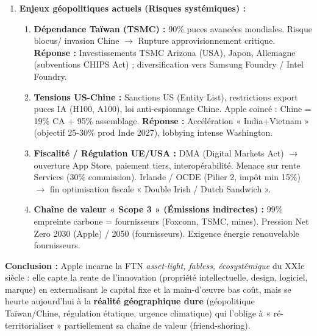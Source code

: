 \documentclass[11pt]{article}
\begin{document}
\begin{exoresolu}
\begin{enumerate}
        \item \textbf{Enjeux géopolitiques actuels (Risques systémiques) :}
            \begin{enumerate}
                \item \textbf{Dépendance Taïwan (TSMC) :} 90\% puces avancées mondiales. Risque blocus/ invasion Chine $\rightarrow$ Rupture approvisionnement critique. \textbf{Réponse :} Investissements TSMC Arizona (USA), Japon, Allemagne (subventions CHIPS Act) ; diversification vers Samsung Foundry / Intel Foundry.
                \item \textbf{Tensions US-Chine :} Sanctions US (Entity List), restrictions export puces IA (H100, A100), loi anti-espionnage Chine. Apple coincé : Chine = 19\% CA + 95\% assemblage. \textbf{Réponse :} Accélération « India+Vietnam » (objectif 25-30\% prod Inde 2027), lobbying intense Washington.
                \item \textbf{Fiscalité / Régulation UE/USA :} DMA (Digital Markets Act) $\rightarrow$ ouverture App Store, paiement tiers, interopérabilité. Menace sur rente Services (30\% commission). Irlande / OCDE (Pilier 2, impôt min 15\%) $\rightarrow$ fin optimisation fiscale « Double Irish / Dutch Sandwich ».
                \item \textbf{Chaîne de valeur « Scope 3 » (Émissions indirectes) :} 99\% empreinte carbone = fournisseurs (Foxconn, TSMC, mines). Pression Net Zero 2030 (Apple) / 2050 (fournisseurs). Exigence énergie renouvelable fournisseurs.
            \end{enumerate}
    \end{enumerate}
    \textbf{Conclusion :} Apple incarne la FTN \emph{asset-light, fabless, écosystémique} du XXIe siècle : elle capte la rente de l'innovation (propriété intellectuelle, design, logiciel, marque) en externalisant le capital fixe et la main-d'œuvre bas coût, mais se heurte aujourd'hui à la \textbf{réalité géographique dure} (géopolitique Taïwan/Chine, régulation étatique, urgence climatique) qui l'oblige à « ré-territorialiser » partiellement sa chaîne de valeur (friend-shoring).
\end{exoresolu}
\end{document}
